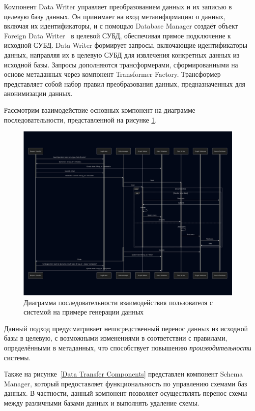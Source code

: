 Компонент Data Writer управляет преобразованием данных и их записью в целевую базу данных. Он принимает на вход метаинформацию о данных, включая их идентификаторы, и с помощью Database Manager создаёт объект Foreign Data Writer~\cite{fdw} в целевой СУБД, обеспечивая прямое подключение к исходной СУБД. Data Writer формирует запросы, включающие идентификаторы данных, направляя их в целевую СУБД для извлечения конкретных данных из исходной базы. Запросы дополняются трансформерами, сформированными на основе метаданных через компонент Transformer Factory. Трансформер представляет собой набор правил преобразования данных, предназначенных для анонимизации данных.

Рассмотрим взаимодействие основных компонент на диаграмме последовательности, представленной на рисунке \ref{Sequence DataTransferComponents}.

\begin{figure}
  \includegraphics[scale=0.2]{./img/mermaid-sequence-DataTransfer.png}
  \caption{Диаграмма последовательности взаимодействия пользователя с системой на примере генерации данных}
  \label{Sequence DataTransferComponents}
\end{figure}

Данный подход предусматривает непосредственный перенос данных из исходной базы в целевую, с возможными изменениями в соответствии с правилами, определёнными в метаданных, что способствует повышению \textit{производительности} системы.

Также на рисунке~\ref{Data Transfer Components} представлен компонент Schema Manager, который предоставляет функциональность по управлению схемами баз данных. В частности, данный компонент позволяет осуществлять перенос схемы между различными базами данных и выполнять удаление схемы.

